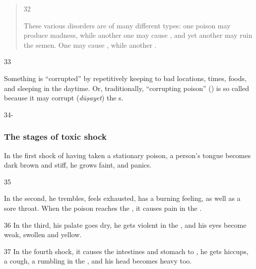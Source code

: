\begin{translation}
\begin{verse}
        
        \item[32]
 
            These various disorders are of many different types: one poison may 
            produce
            madness, while another one may cause , and 
            yet
            another may ruin the semen. One may cause , while 
            another
            .
 
    \end{verse}

    
    \item[33]  
    
Something is “corrupted” by repetitively keeping to bad locations,
times, foods, and sleeping in the daytime.  Or, traditionally,
“corrupting poison” () is so called
because it may corrupt (\emph{dūṣayet}) the s.
    
    
    \item[34-]
    
    \subsubsection{The stages of toxic shock}
    \label{stagesofshock}

    In the first shock of having taken a stationary poison, a person's tongue 
    becomes dark brown and stiff, he grows faint, and panics.
    
    \item[35]
    
    In the second, he trembles, feels exhausted, has a burning
feeling, as well as a sore throat.  When the poison reaches the
, it causes pain in the .
    
    
    
    \item[36]
    In the third, his palate goes dry, he gets violent  in the 
    , and his eyes become weak, swollen and yellow.

    \item[37]
    In the fourth shock, it causes the intestines and stomach to
    , he gets hiccups, a cough,  a rumbling in the
    , and his head becomes heavy too.
    

\end{translation}

